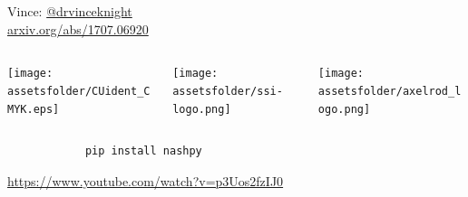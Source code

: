 \documentclass{beamer}
\newcommand{\assetsfolder}{./assets}
\begin{document}
    \begin{frame}
        \begin{center}
            \Large
               Vince: \href{https://twitter.com/drvinceknight}{@drvinceknight}\\

               \href{https://arxiv.org/abs/1707.06920}{arxiv.org/abs/1707.06920}
               \vfill
               \begin{columns}
                   \begin{column}{.3\textwidth}
                       \begin{center}
                       \texttt{[image: \\assetsfolder/CUident\_CMYK.eps]}
                       \end{center}
                   \end{column}
                   \begin{column}{.3\textwidth}
                       \begin{center}
                       \texttt{[image: \\assetsfolder/ssi-logo.png]}
                       \end{center}
                   \end{column}
                   \begin{column}{.3\textwidth}
                       \begin{center}
                       \texttt{[image: \\assetsfolder/axelrod\_logo.png]}
                       \end{center}
                   \end{column}
               \end{columns}
        \end{center}

    \end{frame}

    \begin{frame}
        
    \end{frame}

    \begin{frame}[fragile]{}
            \begin{verbatim}
            pip install nashpy
            \end{verbatim}
\end{frame}

    \begin{frame}
        \begin{center}
            \url{https://www.youtube.com/watch?v=p3Uos2fzIJ0}
        \end{center}
    \end{frame}
\end{document}
